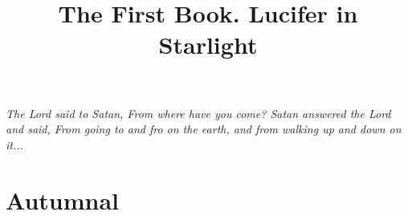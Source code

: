 \documentclass{amsbook}
\title{The First Book. Lucifer in Starlight}
\begin{document}
    \frontmatter

    \maketitle

    \thispagestyle{empty}
    \vspace*{\fill}
    \noindent \textit{The Lord said to Satan, From where have you come? Satan answered the Lord and said, From going to and fro on the earth, and from walking up and down on it...}
    \vspace*{\fill}
    \clearpage

    \tableofcontents

    \mainmatter

    \chapter{Autumnal}
\end{document}
